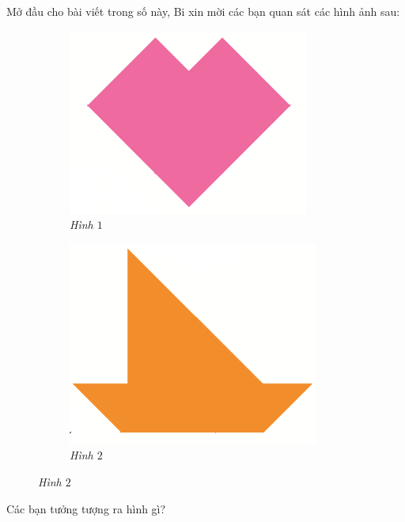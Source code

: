 \newpage
\graphicspath{{../choicungbi/tangram/}}
	\begingroup
	\centering
	\endgroup	
	
\vspace*{25pt}

	Mở đầu cho bài viết trong số này, Bi xin mời các bạn quan sát các hình ảnh sau:
	\begin{figure}[H]
		\vspace*{-5pt}
		\centering
		\captionsetup{labelformat=empty}
		\begin{subfigure}{.45\textwidth}
		\captionsetup{labelformat=empty}
		\centering
		\includegraphics[width=.5\linewidth]{image1}
		\caption{\small \it Hình $1$}
		\end{subfigure}
		\begin{subfigure}{.45\textwidth}
		\captionsetup{labelformat=empty}
		\centering
		\includegraphics[width=.5\linewidth]{image2}
		\caption{\small \it Hình $2$}
	\end{subfigure}
	\vspace*{-10pt}
\end{figure}	
	Các bạn tưởng tượng ra hình gì?
